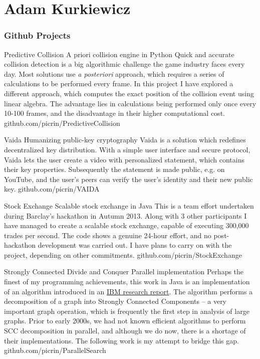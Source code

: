 \documentclass{tccv}
\begin{document}
\setlength{\emergencystretch}{3em}
\part{Adam Kurkiewicz}

\section{Github Projects}


\begin{eventlist}

\item{Predictive Collision}
     {A priori collision engine in Python}
     {Quick and accurate collision detection is a big algorithmic challenge the game industry faces every day. Most solutions use \textit{a posteriori} approach, which requires a series of calculations to be performed every frame. In this project I have explored a different approach, which computes the exact position of the collision event using linear algebra. The advantage lies in calculations being performed only once every 10-100 frames, and the disadvantage in their higher computational cost.}
     {github.com/picrin/PredictiveCollision}
\item{Vaida}
     {Humanizing public-key cryptography}
     {Vaida is a solution which redefines decentralized key distribution. With a simple user interface and secure protocol, Vaida lets the user create a video with personalized statement, which contains their key properties. Subsequently the statement is made public, e.g. on YouTube, and the user's peers can verify the user's identity and their new public key.}
     {github.com/picrin/VAIDA}

\item{Stock Exchange}
     {Scalable stock exchange in Java}
     {This is a team effort undertaken during Barclay's hackathon in Autumn 2013. Along with 3 other participants I have managed to create a scalable stock exchange, capable of executing 300,000 trades per second. The code shows a genuine 24-hour effort, and no post-hackathon development was carried out. I have plans to carry on with the project, depending on other commitments.}
     {github.com/picrin/StockExchange}

\item{Strongly Connected Divide and Conquer}
     {Parallel implementation}
     {Perhaps the finest of my programming achievements, this work in Java is an implementation of an algorithm introduced in an \href{http://domino.research.ibm.com/library/cyberdig.nsf/1e4115aea78b6e7c85256b360066f0d4/d8e3597a4172437b8525709f006e42b0?OpenDocument}{IBM research report}. The algorithm performs a decomposition of a graph into Strongly Connected Components -- a very important graph operation, which is frequently the first step in analysis of large graphs. Prior to early 2000s, we had not known efficient algorithms to perform SCC decomposition in parallel, and although we do now, there is a shortage of their implementations. The following work is my attempt to bridge this gap.}
    {github.com/picrin/ParallelSearch}


\end{eventlist}
\end{document}
